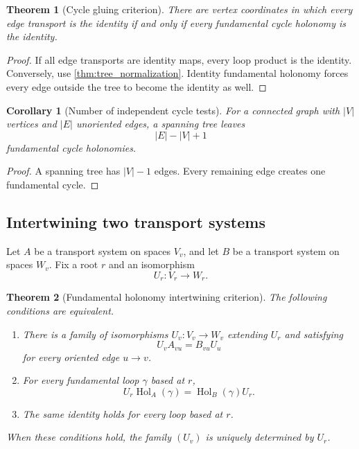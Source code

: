 \documentclass{aomart}
\newtheorem{theorem}{Theorem}[section]
\newtheorem{corollary}[corollary]{Corollary}
\theoremstyle{definition}
\theoremstyle{remark}
\newcommand{\Hol}{\operatorname{Hol}}
\begin{document}
\begin{theorem}[Cycle gluing criterion]\label{thm:cycle_gluing}
There are vertex coordinates in which every edge transport is the identity if and only if every fundamental cycle holonomy is the identity.
\end{theorem}

\begin{proof}
If all edge transports are identity maps, every loop product is the identity.  Conversely, use \cref{thm:tree_normalization}.  Identity fundamental holonomy forces every edge outside the tree to become the identity as well.
\end{proof}

\begin{corollary}[Number of independent cycle tests]\label{cor:cycle_number}
For a connected graph with $|V|$ vertices and $|E|$ unoriented edges, a spanning tree leaves
\[
|E|-|V|+1
\]
fundamental cycle holonomies.
\end{corollary}

\begin{proof}
A spanning tree has $|V|-1$ edges.  Every remaining edge creates one fundamental cycle.
\end{proof}


\subsection{Intertwining two transport systems}

Let $A$ be a transport system on spaces $V_v$, and let $B$ be a transport system on spaces $W_v$.  Fix a root $r$ and an isomorphism
\[
U_r:V_r\longrightarrow W_r.
\]

\begin{theorem}[Fundamental holonomy intertwining criterion]\label{thm:holonomy_intertwining}
The following conditions are equivalent.
\begin{enumerate}
\item There is a family of isomorphisms $U_v:V_v\to W_v$ extending $U_r$ and satisfying
\[
U_vA_{vu}=B_{vu}U_u
\]
for every oriented edge $u\to v$.
\item For every fundamental loop $\gamma$ based at $r$,
\[
U_r\Hol_A(\gamma)=\Hol_B(\gamma)U_r.
\]
\item The same identity holds for every loop based at $r$.
\end{enumerate}
When these conditions hold, the family $(U_v)$ is uniquely determined by $U_r$.
\end{theorem}
\end{document}
